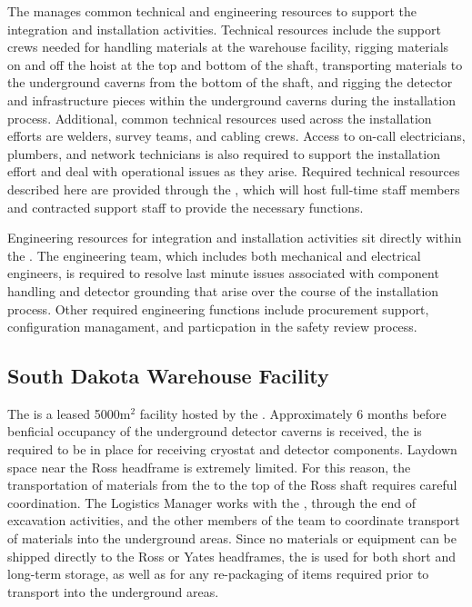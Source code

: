 The  manages common technical and engineering resources 
to support the integration and installation activities.  Technical
resources include the support crews needed for handling materials 
at the warehouse facility, rigging materials on and off the hoist 
at the top and bottom of the shaft, transporting materials to the
underground caverns from the bottom of the shaft, and rigging the 
detector and infrastructure pieces within the underground caverns 
during the installation process.  Additional, common technical 
resources used across the installation efforts are welders, 
survey teams, and cabling crews.  Access to on-call electricians, 
plumbers, and network technicians is also required to support 
the installation effort and deal with operational issues as they 
arise.  Required technical resources described here are provided 
through the , which will host full-time staff members 
and contracted support staff to provide the necessary functions.     

Engineering resources for integration and installation activities 
sit directly within the .  The engineering team, which 
includes both mechanical and electrical engineers, is required to 
resolve last minute issues associated with component handling and 
detector grounding that arise over the course of the installation 
process.  Other required engineering functions include procurement
support, configuration managament, and particpation in the safety 
review process.

\subsection{South Dakota Warehouse Facility}

The  is a leased 5000m$^2$ facility hosted by the
.  Approximately 6 months before benficial occupancy 
of the underground detector caverns is received, the  
is required to be in place for receiving cryostat and detector 
components.  Laydown space near the Ross headframe is extremely 
limited.  For this reason, the transportation of materials from 
the  to the top of the Ross shaft requires careful 
coordination. The  Logistics Manager works with 
the , through the end of excavation activities, and 
the other members of the  team to coordinate transport 
of materials into the underground areas.  Since no materials or 
equipment can be shipped directly to the Ross or Yates headframes, 
the  is used for both short and long-term storage, as 
well as for any re-packaging of items required prior to transport 
into the underground areas. 

